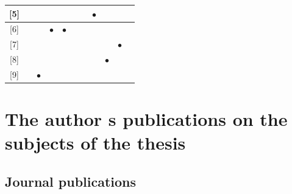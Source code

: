 \documentclass{article}
\begin{document}
\begin{table}[h!]
\begin{tabular}{|c|c|c|c|c|c|c|c|c|c|c|}
{[}5{]}                               & \multicolumn{1}{c|}{}          & \multicolumn{1}{c|}{}          & \multicolumn{1}{c|}{}          & \multicolumn{1}{c|}{}          & \multicolumn{1}{c|}{}          & \multicolumn{1}{c|}{}          & \multicolumn{1}{c|}{$\bullet$} & \multicolumn{1}{c|}{}          &           \\ \hline
{[}6{]}                               & \multicolumn{1}{c|}{}          & \multicolumn{1}{c|}{}          & \multicolumn{1}{c|}{$\bullet$} & \multicolumn{1}{c|}{$\bullet$} & \multicolumn{1}{c|}{}          & \multicolumn{1}{c|}{}          & \multicolumn{1}{c|}{}          & \multicolumn{1}{c|}{}          &           \\ \hline
{[}7{]}                               & \multicolumn{1}{c|}{}          & \multicolumn{1}{c|}{}          & \multicolumn{1}{c|}{}          & \multicolumn{1}{c|}{}          & \multicolumn{1}{c|}{}          & \multicolumn{1}{c|}{}          & \multicolumn{1}{c|}{}          & \multicolumn{1}{c|}{}          & $\bullet$ \\ \hline
{[}8{]}                               & \multicolumn{1}{c|}{}          & \multicolumn{1}{c|}{}          & \multicolumn{1}{c|}{}          & \multicolumn{1}{c|}{}          & \multicolumn{1}{c|}{}          & \multicolumn{1}{c|}{}          & \multicolumn{1}{c|}{}          & \multicolumn{1}{c|}{$\bullet$} &           \\ \hline
{[}9{]}                               & \multicolumn{1}{c|}{}          & \multicolumn{1}{c|}{$\bullet$} & \multicolumn{1}{c|}{}          & \multicolumn{1}{c|}{}          & \multicolumn{1}{c|}{}          & \multicolumn{1}{c|}{}          & \multicolumn{1}{c|}{}          & \multicolumn{1}{c|}{}          &           \\ \hline
\end{tabular}
\end{table}

\newpage
\section*{The author s publications on the subjects of the thesis}

\vspace*{1em}

\subsection*{Journal publications}
\end{document}
